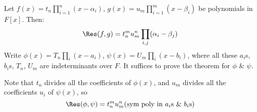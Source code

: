 \thm Let $f(x)=t_n\prod_{i=1}^n(x-\alpha_i)$, $g(x)=u_m\prod_{i=1}^m(x-\beta_i)$ be polynomials in $F[x]$.  Then:
\[ \Res(f,g) = t_n^m u_m^n \prod_{i,j}(\alpha_i-\beta_j) \]
\pf Write $\phi(x)=T_n\prod_i(x-a_i)$, $\psi(x)=U_m\prod_i(x-b_i)$, where all these $a_i$s, $b_i$s, $T_n$, $U_m$ are indeterminants over $F$.  It suffices to prove the theorem for $\phi$ \& $\psi$.

Note that $t_n$ divides all the coefficients of $\phi(x)$, and $u_m$ divides all the coefficients $u_i$ of $\psi(x)$, so
\[ \Res(\phi,\psi) = t_n^m u_m^n (\text{sym poly in $a_i$s \& $b_i$s}) \]
